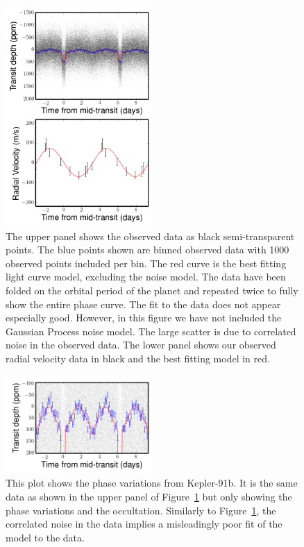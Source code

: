 \documentclass[apjl]{emulateapj}
\begin{document}
\begin{figure}
\includegraphics[width=0.50\textwidth]{koi2133.png}
\caption{The upper panel shows the observed data as black semi-transparent points. The blue points shown are binned observed data with 1000 observed points included per bin. The red curve is the best fitting light curve model, excluding the noise model. The data have been folded on the orbital period of the planet and repeated twice to fully show the entire phase curve. The fit to the data does not appear especially good. However, in this figure we have not included the Gaussian Process noise model. The large scatter is due to correlated noise in the observed data. The lower panel shows our observed radial velocity data in black and the best fitting model in red.}
\label{fig:results}
\end{figure}

\begin{figure}
\includegraphics[width=0.50\textwidth]{koi2133_zoom.png}
\caption{This plot shows the phase variations from Kepler-91b. It is the same data as shown in the upper panel of Figure~\ref{fig:results} but only showing the phase variations and the occultation. Similarly to Figure~\ref{fig:results}, the correlated noise in the data implies a misleadingly poor fit of the model to the data.}
\label{fig:results_zoom}
\end{figure}
\end{document}
